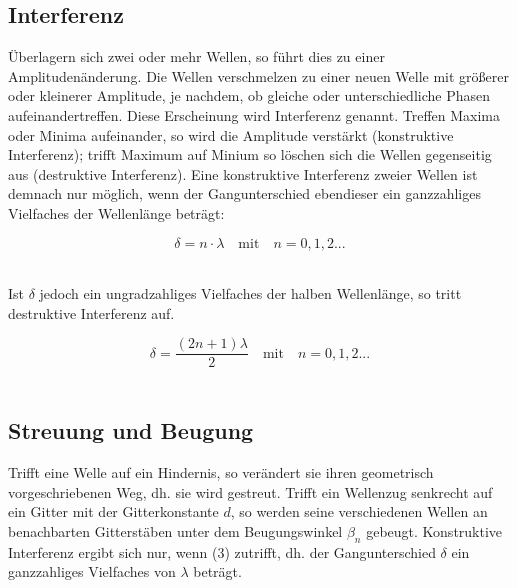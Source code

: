 \documentclass[12pt,a4paper,titlepage,headinclude,bibtotoc]{scrartcl}
\begin{document}


\newpage

\subsection{Interferenz}
Überlagern sich zwei oder mehr Wellen, so führt dies zu einer Amplitudenänderung. Die Wellen verschmelzen zu einer neuen Welle mit größerer oder kleinerer Amplitude, je nachdem, ob gleiche oder unterschiedliche Phasen aufeinandertreffen. Diese Erscheinung wird Interferenz genannt. Treffen Maxima oder Minima aufeinander, so wird die Amplitude verstärkt (konstruktive Interferenz); trifft Maximum auf Minium so löschen sich die Wellen gegenseitig aus (destruktive Interferenz). 
Eine konstruktive Interferenz zweier Wellen ist demnach nur möglich, wenn der Gangunterschied ebendieser ein ganzzahliges Vielfaches der Wellenlänge beträgt:\\
\par
\begin{equation}
\delta={n}\cdot {\lambda} \quad \mathrm{mit}\quad n = 0,1,2...
\end{equation}
\\
\par

Ist $\delta$ jedoch ein ungradzahliges Vielfaches der halben Wellenlänge, so tritt destruktive Interferenz auf. \\
\par
\begin{equation}
\delta = \frac{(2n+1)\lambda}{2} \quad \mathrm{mit}\quad  n=0,1,2...
\end{equation}
\\
\par


\subsection{Streuung und Beugung}
Trifft eine Welle auf ein Hindernis, so verändert sie ihren geometrisch vorgeschriebenen Weg, dh. sie wird gestreut. %
Trifft ein Wellenzug senkrecht auf ein Gitter mit der Gitterkonstante $d$, so werden seine verschiedenen Wellen an benachbarten Gitterstäben unter dem Beugungswinkel $\beta_n$ gebeugt. Konstruktive Interferenz ergibt sich nur, wenn (3) zutrifft, dh. der Gangunterschied $\delta$ ein ganzzahliges Vielfaches von $\lambda$ beträgt.
\end{document}

